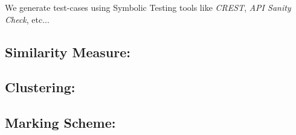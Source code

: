 \documentclass{article}
\begin{document}
    We generate test-cases using Symbolic Testing \cite{Symbolic} tools like \textit{CREST}, \textit{API Sanity Check}, etc...

\subsection{Similarity Measure:}



\subsection{Clustering:}



\subsection{Marking Scheme:}
    


    
\printbibliography
\end{document}
